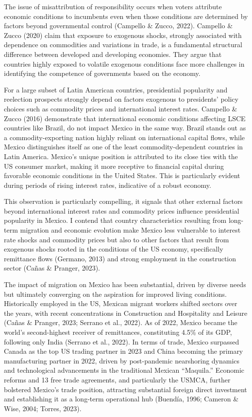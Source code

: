 \documentclass[
]{article}
\begin{document}
The issue of misattribution of responsibility occurs when voters
attribute economic conditions to incumbents even when those conditions
are determined by factors beyond governmental control (Campello \&
Zucco, 2022). Campello \& Zucco (2020) claim that exposure to exogenous
shocks, strongly associated with dependence on commodities and
variations in trade, is a fundamental structural difference between
developed and developing economies. They argue that countries highly
exposed to volatile exogenous conditions face more challenges in
identifying the competence of governments based on the economy.

For a large subset of Latin American countries, presidential popularity
and reelection prospects strongly depend on factors exogenous to
presidents' policy choices such as commodity prices and international
interest rates. Campello \& Zucco (2016) demonstrate that international
economic conditions affecting LSCE countries like Brazil, do not impact
Mexico in the same way. Brazil stands out as a commodity-exporting
nation highly reliant on international capital flows, while Mexico
distinguishes itself as one of the least commodity-dependent countries
in Latin America. Mexico's unique position is attributed to its close
ties with the US consumer market, making it more receptive to financial
capital during favorable economic conditions in the United States. This
is particularly evident during periods of rising interest rates,
indicative of a robust economy.

This observation is particularly compelling, it signals that other
external factors beyond international interest rates and commodity
prices influence presidential popularity in Mexico. I contend that
country characteristics resulting from long-term migration and economic
evolution make Mexico less vulnerable to interest rate shocks and
commodity prices but also to other factors that result from exogenous
shocks rooted in the conditions of the US economy, specifically
remittance flows (Germano, 2013) and strong employment in the
construction sector (Cañas \& Pranger, 2023).

The impact of migration on Mexico has been substantial, driven by
diverse needs but ultimately converging on the aspiration for improved
living conditions. Historically employed in the US, Mexican migrant
workers shifted sectors over the years, with recent concentrations in
Construction and Hospitality and Leisure (Cañas \& Pranger, 2023;
Serrano et al., 2022). As of 2022, Mexico became the world's
second-highest receiver of remittances, constituting 4.5\% of its GDP,
following only India (Serrano et al., 2022). In terms of trade, Mexico
surpassed Canada as the top US trading partner in 2023 and China
becoming the primary manufacturing partner in 2022, driven by
post-pandemic nearshoring dynamics and technological advancements in the
traditional Mexican ``Maquila.'' Economic reforms and 13 free trade
agreements, and particularly the USMCA, further bolstered Mexico's trade
position, attracting substantial foreign direct investment and
establishing it as a long-term operational hub (Buendía, 1996; Cameron
\& Wise, 2004; Torres, 2023).
\end{document}
